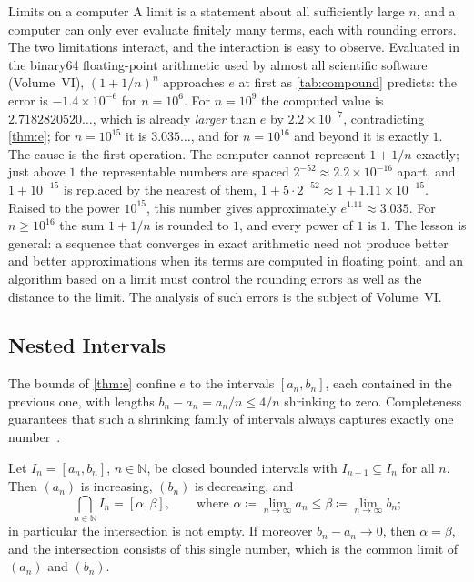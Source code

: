 \begin{note}{Limits on a computer}
A limit is a statement about all sufficiently large $n$, and a computer can only ever evaluate finitely many terms, each with rounding errors. The two limitations interact, and the interaction is easy to observe. Evaluated in the binary64 floating-point arithmetic used by almost all scientific software (Volume~VI), $(1+1/n)^n$ approaches $e$ at first as \cref{tab:compound} predicts: the error is $-1.4\times10^{-6}$ for $n=10^6$. For $n=10^9$ the computed value is $2.7182820520\ldots$, which is already \emph{larger} than $e$ by $2.2\times10^{-7}$, contradicting \cref{thm:e}; for $n=10^{15}$ it is $3.035\ldots$, and for $n=10^{16}$ and beyond it is exactly $1$. The cause is the first operation. The computer cannot represent $1+1/n$ exactly; just above $1$ the representable numbers are spaced $2^{-52}\approx2.2\times10^{-16}$ apart, and $1+10^{-15}$ is replaced by the nearest of them, $1+5\cdot2^{-52}\approx1+1.11\times10^{-15}$. Raised to the power $10^{15}$, this number gives approximately $e^{1.11}\approx3.035$. For $n\ge10^{16}$ the sum $1+1/n$ is rounded to $1$, and every power of $1$ is $1$. The lesson is general: a sequence that converges in exact arithmetic need not produce better and better approximations when its terms are computed in floating point, and an algorithm based on a limit must control the rounding errors as well as the distance to the limit. The analysis of such errors is the subject of Volume~VI.
\end{note}

\subsection{Nested Intervals}

The bounds of \cref{thm:e} confine $e$ to the intervals $[a_n,b_n]$, each contained in the previous one, with lengths $b_n-a_n=a_n/n\le4/n$ shrinking to zero. Completeness guarantees that such a shrinking family of intervals always captures exactly one number~\cite{abbott2015}.

\begin{theorem}
\label{thm:nested}
Let $I_n=[a_n,b_n]$, $n\in\mathbb N$, be closed bounded intervals with $I_{n+1}\subseteq I_n$ for all $n$. Then $(a_n)$ is increasing, $(b_n)$ is decreasing, and
\[
\bigcap_{n\in\mathbb N}I_n=[\alpha,\beta],\qquad\text{where }\alpha\coloneqq\lim_{n\to\infty}a_n\le\beta\coloneqq\lim_{n\to\infty}b_n ;
\]
in particular the intersection is not empty. If moreover $b_n-a_n\to0$, then $\alpha=\beta$, and the intersection consists of this single number, which is the common limit of $(a_n)$ and $(b_n)$.
\end{theorem}

